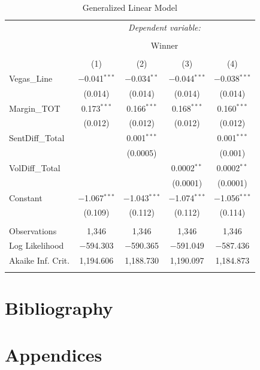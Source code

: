 \documentclass[12pt]{article}
\begin{document}
\begin{doublespacing}
\begin{table}[H] 
\centering 
\caption{Generalized Linear Model} 
\label{} 
\begin{tabular*}{\textwidth}{@{\extracolsep{\fill}}lcccc} 
\hline 
\hline
 & \multicolumn{4}{c}{\textit{Dependent variable:}} \\ 
\cline{2-5} 
\\[-3.0ex] & \multicolumn{4}{c}{Winner} \\ 
\\[-1.5ex] & (1) & (2) & (3) & (4)\\ 
\hline
 Vegas\_Line & $-$0.041$^{***}$ & $-$0.034$^{**}$ & $-$0.044$^{***}$ & $-$0.038$^{***}$ \\ 
  & (0.014) & (0.014) & (0.014) & (0.014) \\ 
 Margin\_TOT & 0.173$^{***}$ & 0.166$^{***}$ & 0.168$^{***}$ & 0.160$^{***}$ \\ 
  & (0.012) & (0.012) & (0.012) & (0.012) \\ 
 SentDiff\_Total &  & 0.001$^{***}$ &  & 0.001$^{***}$ \\ 
  &  & (0.0005) &  & (0.001) \\ 
 VolDiff\_Total &  &  & 0.0002$^{**}$ & 0.0002$^{**}$ \\ 
  &  &  & (0.0001) & (0.0001) \\ 
 Constant & $-$1.067$^{***}$ & $-$1.043$^{***}$ & $-$1.074$^{***}$ & $-$1.056$^{***}$ \\ 
  & (0.109) & (0.112) & (0.112) & (0.114) \\ 
\hline \\[-1.8ex] 
Observations & 1,346 & 1,346 & 1,346 & 1,346 \\ 
Log Likelihood & $-$594.303 & $-$590.365 & $-$591.049 & $-$587.436 \\ 
Akaike Inf. Crit. & 1,194.606 & 1,188.730 & 1,190.097 & 1,184.873 \\
\hline 
\hline \\[-1.8ex] 
\end{tabular*} 
\end{table} 

\section{Bibliography}

\section{Appendices}

\end{doublespacing}
\end{document}
